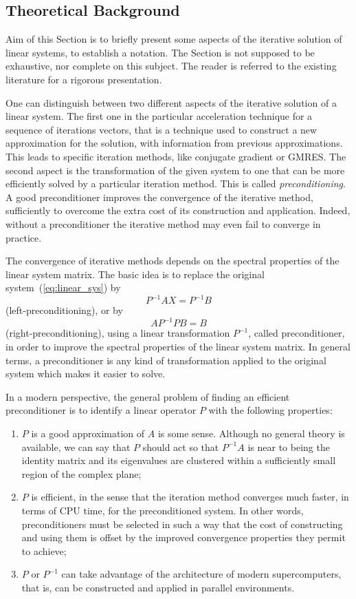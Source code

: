 
\subsection{Theoretical Background}
\label{aztecoo:theoretical}

Aim of this Section is to briefly present some aspects of the iterative
solution of linear systems, to establish a notation. The Section is not
supposed to be exhaustive, nor complete on this subject. The reader is
referred to the existing literature for a rigorous presentation.

\medskip

One can distinguish between two different aspects of the iterative
solution of a linear system. The first one in the particular
acceleration technique for a sequence of iterations vectors, that is a
technique used to construct a new approximation for the solution, with
information from previous approximations.  This leads to specific
iteration methods, like conjugate gradient or GMRES. The second aspect
is the transformation of the given system to one that can be more
efficiently solved by a particular iteration method. This is called {\em
  preconditioning}.  A good preconditioner improves the convergence of
the iterative method, sufficiently to overcome the extra cost of its
construction and application. Indeed, without a preconditioner the
iterative method may even fail to converge in practice. 

The convergence of iterative methods depends on the spectral properties
of the linear system matrix. The basic idea is to replace the original
system~(\ref{eq:linear_sys}) by
\[
P^{-1} A X = P^{-1} B
\]
(left-preconditioning), or by
\[
A P^{-1} P B = B
\]
(right-preconditioning), using a linear transformation $P^{-1}$,
called preconditioner, in order to improve the spectral properties of
the linear system matrix. In general terms, a preconditioner is any
kind of transformation applied to the original system which makes it
easier to solve.

In a modern perspective, the general problem of finding an efficient
preconditioner is to identify a linear operator $P$ with the following
properties:
\begin{enumerate}
\item $P$ is a good approximation of $A$ is some sense. Although no
  general theory is available, we can say that $P$ should act so that
  $P^{-1} A$ is near to being the identity matrix and its eigenvalues
  are clustered within a sufficiently small region of the complex plane;
\item $P$ is efficient, in the sense that the iteration method converges
  much faster, in terms of CPU time, for the preconditioned system.  In
  other words, preconditioners must be selected in such a way that the
  cost of constructing and using them is offset by the improved
  convergence properties they permit to achieve;
\item $P$ or $P^{-1}$ can take advantage of the architecture of modern
  supercomputers, that is, can be constructed and applied in parallel
  environments.
\end{enumerate}

